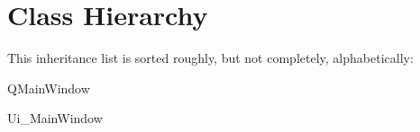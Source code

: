 \section{Class Hierarchy}
This inheritance list is sorted roughly, but not completely, alphabetically\+:\begin{DoxyCompactList}
\item {}
\item Q\+Main\+Window\begin{DoxyCompactList}
\item {}
\end{DoxyCompactList}
\item Ui\+\_\+\+Main\+Window\begin{DoxyCompactList}
\item {}
\end{DoxyCompactList}
\end{DoxyCompactList}
